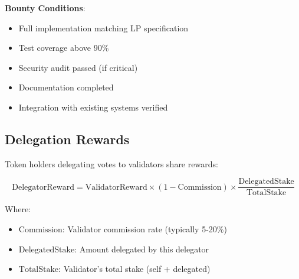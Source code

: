 \textbf{Bounty Conditions}:
\begin{itemize}
\item Full implementation matching LP specification
\item Test coverage above 90\%
\item Security audit passed (if critical)
\item Documentation completed
\item Integration with existing systems verified
\end{itemize}

\subsection{Delegation Rewards}

Token holders delegating votes to validators share rewards:

\begin{equation}
\text{DelegatorReward} = \text{ValidatorReward} \times (1 - \text{Commission}) \times \frac{\text{DelegatedStake}}{\text{TotalStake}}
\end{equation}

Where:
\begin{itemize}
\item $\text{Commission}$: Validator commission rate (typically 5-20\%)
\item $\text{DelegatedStake}$: Amount delegated by this delegator
\item $\text{TotalStake}$: Validator's total stake (self + delegated)
\end{itemize}

